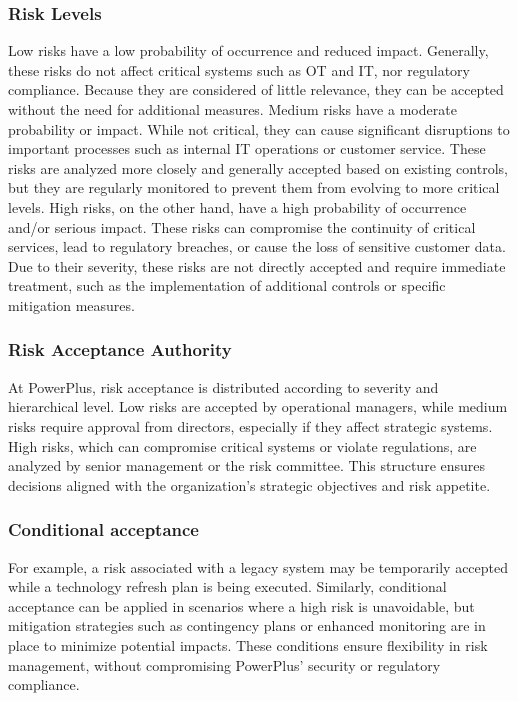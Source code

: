 \subsubsection{Risk Levels}

Low risks have a low probability of occurrence and reduced impact. Generally, these risks do not affect critical systems such as OT and IT, nor regulatory compliance. Because they are considered of little relevance, they can be accepted without the need for additional measures.
Medium risks have a moderate probability or impact. While not critical, they can cause significant disruptions to important processes such as internal IT operations or customer service. These risks are analyzed more closely and generally accepted based on existing controls, but they are regularly monitored to prevent them from evolving to more critical levels.
High risks, on the other hand, have a high probability of occurrence and/or serious impact. These risks can compromise the continuity of critical services, lead to regulatory breaches, or cause the loss of sensitive customer data. Due to their severity, these risks are not directly accepted and require immediate treatment, such as the implementation of additional controls or specific mitigation measures.

\subsubsection{Risk Acceptance Authority}

At PowerPlus, risk acceptance is distributed according to severity and hierarchical level. Low risks are accepted by operational managers, while medium risks require approval from directors, especially if they affect strategic systems. High risks, which can compromise critical systems or violate regulations, are analyzed by senior management or the risk committee. This structure ensures decisions aligned with the organization's strategic objectives and risk appetite.

\subsubsection{Conditional acceptance}

For example, a risk associated with a legacy system may be temporarily accepted while a technology refresh plan is being executed. Similarly, conditional acceptance can be applied in scenarios where a high risk is unavoidable, but mitigation strategies such as contingency plans or enhanced monitoring are in place to minimize potential impacts.
These conditions ensure flexibility in risk management, without compromising PowerPlus' security or regulatory compliance.

